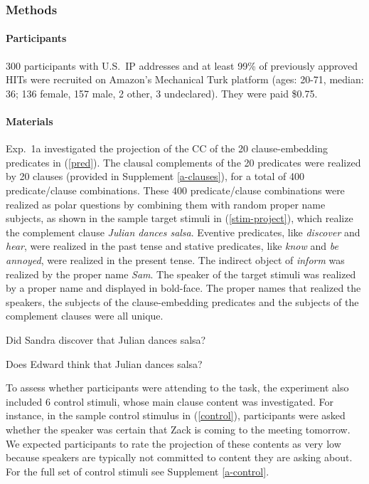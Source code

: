 \documentclass[11pt,fleqn]{article}
\newcommand{\6}{\mbox{$[\hspace*{-.6mm}[$}}
\newcommand{\9}{\mbox{$]\hspace*{-.6mm}]$}}
\begin{document}
\subsubsection{Methods}

\paragraph{Participants} 300 participants with U.S.\ IP addresses and at least 99\% of previously approved HITs were recruited on Amazon's Mechanical Turk platform (ages: 20-71, median: 36; 136 female, 157 male, 2 other, 3 undeclared). They were paid \$0.75.

\paragraph{Materials} Exp.~1a investigated the projection of the CC of the 20 clause-embedding predicates in (\ref{pred}).  The clausal complements of the 20 predicates were realized by 20 clauses (provided in Supplement \ref{a-clauses}), for a total of 400 predicate/clause combinations. These 400 predicate/clause combinations were realized as polar questions by combining them with random proper name subjects, as shown in the sample target stimuli in (\ref{stim-project}), which realize the complement clause {\em Julian dances salsa}. Eventive predicates, like {\em discover} and {\em hear}, were realized in the past tense and stative predicates, like {\em know} and {\em be annoyed}, were realized in the present tense. The indirect object of {\em inform} was realized by the proper name {\em Sam}.  The speaker of the target stimuli was realized by a proper name and displayed in bold-face. The proper names that realized the speakers, the subjects of the clause-embedding predicates and the subjects of the complement clauses were all unique.

\begin{exe}
\ex\label{stim-project} 
\begin{xlist}
 Did Sandra discover that Julian dances salsa?

 Does Edward think that Julian dances salsa?
\end{xlist}
\end{exe}

To assess whether participants were attending to the task, the experiment also included 6 control stimuli, whose main clause content was investigated. For instance, in the sample control stimulus in (\ref{control}), participants were asked whether the speaker was certain that Zack is coming to the meeting tomorrow. We expected participants to rate the projection of these contents as very low because speakers are typically not committed to content they are asking about. For the full set of control stimuli see Supplement \ref{a-control}.
\end{document}
